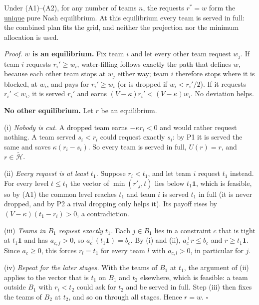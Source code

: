 \documentclass[10pt]{article}
\newcommand{\alert}[1]{{\color{alertblue}\uline{#1}}}
\begin{document}
\begin{keybox}
Under (A1)--(A2), for any number of teams $n$, the requests $r^* = w$ form the
\alert{unique} pure Nash equilibrium. At this equilibrium every team is served
in full: the combined plan fits the grid, and neither the projection nor the
minimum allocation is used.
\end{keybox}
\emph{Proof.} \textbf{$w$ is an equilibrium.} Fix team $i$ and let every other
team request $w_j$. If team $i$ requests $r_i' \ge w_i$, water-filling follows
exactly the path that defines $w$, because each other team stops at $w_j$
either way; team $i$ therefore stops where it is blocked, at $w_i$, and pays
for $r_i' \ge w_i$ (or is dropped if $w_i < r_i'/2$). If it requests
$r_i' < w_i$, it is served $r_i'$ and earns $(V-\kappa) r_i' < (V-\kappa) w_i$.
No deviation helps.

\textbf{No other equilibrium.} Let $r$ be an equilibrium.

(i) \emph{Nobody is cut.} A dropped team earns $-\kappa r_i < 0$ and would
rather request nothing. A team served $s_i < r_i$ could request exactly $s_i$:
by P1 it is served the same and saves $\kappa(r_i - s_i)$. So every team is
served in full, $U(r) = r$, and $r \in \widetilde{\mathcal H}$.

(ii) \emph{Every request is at least $t_1$.} Suppose $r_i < t_1$, and let team
$i$ request $t_1$ instead. For every level $t \le t_1$ the vector of
$\min(r'_j, t)$ lies below $t_1 \mathbf 1$, which is feasible, so by (A1) the
common level reaches $t_1$ and team $i$ is served $t_1$ in full (it is never
dropped, and by P2 a rival dropping only helps it). Its payoff rises by
$(V - \kappa)(t_1 - r_i) > 0$, a contradiction.

(iii) \emph{Teams in $B_1$ request exactly $t_1$.} Each $j \in B_1$ lies in a
constraint $c$ that is tight at $t_1 \mathbf 1$ and has $a_{c,j} > 0$, so
$a_c^{\top} (t_1\mathbf 1) = b_c$. By (i) and (ii), $a_c^{\top} r \le b_c$ and
$r \ge t_1 \mathbf 1$. Since $a_c \ge 0$, this forces $r_l = t_1$ for every
team $l$ with $a_{c,l} > 0$, in particular for $j$.

(iv) \emph{Repeat for the later stages.} With the teams of $B_1$ at $t_1$, the
argument of (ii) applies to the vector that is $t_1$ on $B_1$ and $t_2$
elsewhere, which is feasible: a team outside $B_1$ with $r_i < t_2$ could ask
for $t_2$ and be served in full. Step (iii) then fixes the teams of $B_2$ at
$t_2$, and so on through all stages. Hence $r = w$. $\square$
\end{document}
